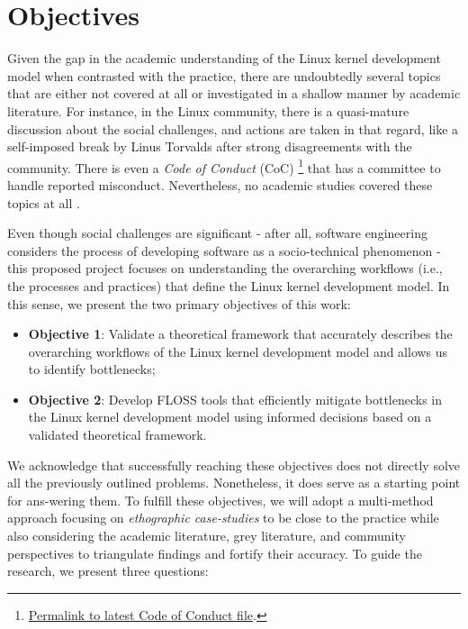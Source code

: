 \section{Objectives}
\label{chp:objectives}

Given the gap in the academic understanding of the Linux kernel development model when contrasted with the practice, there are undoubtedly several topics that are either not covered at all or investigated in a shallow manner by academic literature. For instance, in the Linux community, there is a quasi-mature discussion about the social challenges, and actions are taken in that regard, like a self-imposed break by Linus Torvalds \cite{linus2018-stepdown} after strong disagreements with the community. There is even a \textit{Code of Conduct} (CoC) \footnote{\href{https://www.kernel.org/doc/html/latest/process/code-of-conduct.html}{Permalink to latest Code of Conduct file}.} that has a committee to handle reported misconduct. Nevertheless, no academic studies covered these topics at all \cite{wen2021-masterthesis}.

Even though social challenges are significant - after all, software engineering considers the process of developing software as a socio-technical phenomenon - this proposed project focuses on understanding the overarching workflows (i.e., the processes and practices) that define the Linux kernel development model.
%
In this sense, we present the two primary objectives of this work:

\begin{itemize}
	\item \textbf{Objective 1}: Validate a theoretical framework that accurately describes the overarching workflows of the Linux kernel development model and allows us to identify bottlenecks;
	\item \textbf{Objective 2}: Develop FLOSS tools that efficiently mitigate bottlenecks in the Linux kernel development model using informed decisions based on a validated theoretical framework.
\end{itemize}

We acknowledge that successfully reaching these objectives does not directly solve all the previously outlined problems. Nonetheless, it does serve as a starting point for ans-wering them.
%
To fulfill these objectives, we will adopt a multi-method approach focusing on \textit{ethographic case-studies} to be close to the practice while also considering the academic literature, grey literature, and community perspectives to triangulate findings and fortify their accuracy.
%
To guide the research, we present three questions:

